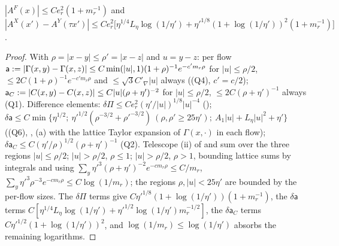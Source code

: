 \begin{lemma}\label{rot:lem:CK6}
$|A^F(x)|\le Ce_r^2(1+m_r^{-1})$ and $|A^X(x')-A^Y(\tau x')|\le Ce_r^2\big[\eta^{1/4}L_\eta\log(1/\eta')+\eta'^{1/8}(1+\log(1/\eta'))^2(1+m_r^{-1})\big]$.
\end{lemma}
\begin{proof}
With $\rho=|x-y|\le\rho'=|x-z|$ and $u=y-z$: per flow $\mathsf a:=|\Gamma(x,y)-\Gamma(x,z)|\le C\min(|u|,1)(1+\rho)^{-1}e^{-c'm_r\rho}$ for $|u|\le\rho/2$, $\le2C(1+\rho)^{-1}e^{-c'm_r\rho}$ and $\le\sqrt3C'_\nabla|u|$ always ((Q4), $c'=c/2$); $\mathsf a_C:=|C(x,y)-C(x,z)|\le C|u|(\rho+\eta')^{-2}$ for $|u|\le\rho/2$, $\le2C(\rho+\eta')^{-1}$ always (Q1). Difference elements: $\delta\Pi\le Ce_r^2(\eta'/|u|)^{1/8}|u|^{-4}$ (); $\delta\mathsf a\le C\min\{\eta^{1/2};\ \eta'^{1/2}(\rho^{-3/2}+\rho'^{-3/2})\ (\rho,\rho'\ge25\eta');\ A_1|u|+L_\eta|u|^2+\eta'\}$ ((Q6), , (a) with the lattice Taylor expansion of $\Gamma(x,\cdot)$ in each flow); $\delta\mathsf a_C\le C(\eta'/\rho)^{1/2}(\rho+\eta')^{-1}$ (Q2). Telescope (ii) of  and sum over the three regions $|u|\le\rho/2$; $|u|>\rho/2$, $\rho\le1$; $|u|>\rho/2$, $\rho>1$, bounding lattice sums by integrals and using $\sum_y\eta'^3(\rho+\eta')^{-2}e^{-cm_r\rho}\le C/m_r$, $\sum_y\eta'^3\rho^{-3}e^{-cm_r\rho}\le C\log(1/m_r)$; the regions $\rho,|u|<25\eta'$ are bounded by the per-flow sizes. The $\delta\Pi$ terms give $C\eta'^{1/8}(1+\log(1/\eta'))(1+m_r^{-1})$, the $\delta\mathsf a$ terms $C[\eta^{1/4}L_\eta\log(1/\eta')+\eta'^{1/2}\log(1/\eta')m_r^{-1/2}]$, the $\delta\mathsf a_C$ terms $C\eta'^{1/2}(1+\log(1/\eta'))^2$, and $\log(1/m_r)\le\log(1/\eta')$ absorbs the remaining logarithms.
\end{proof}

